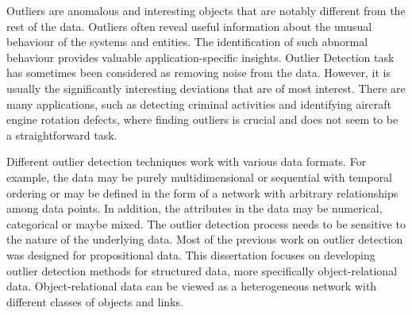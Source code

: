 %
%
%
%
        
        
Outliers are anomalous and interesting objects that are notably different from the rest of the data. Outliers often reveal useful information about the unusual behaviour of the systems and entities.  The identification of such abnormal behaviour provides valuable application-specific insights. 
Outlier Detection task has sometimes been considered as removing noise from
the data. However, it is usually the significantly interesting deviations that are
of most interest. There are many applications, such as detecting criminal activities and
identifying aircraft engine rotation defects, where finding outliers is crucial and
does not seem to be a straightforward task.


Different outlier detection techniques work with various data formats. For example, the data may be purely multidimensional or sequential with temporal
ordering or may be defined in the form of a network with arbitrary relationships
among data points. In addition, the attributes in the data may be numerical,
categorical or maybe mixed. The outlier detection process needs to be sensitive
to the nature of the underlying data.
Most of the previous work on outlier detection was designed for propositional data. This dissertation focuses on developing outlier detection methods for structured data, more specifically object-relational data. %
Object-relational data can be viewed as a heterogeneous network with different classes of objects and links.


